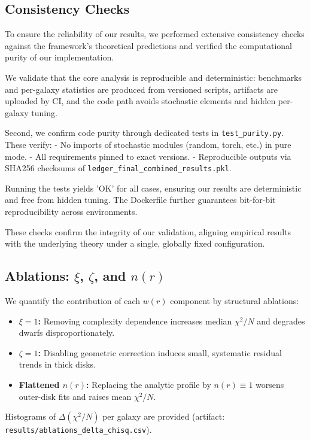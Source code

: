 \documentclass[usenatbib]{mnras}
\begin{document}

\subsection{Consistency Checks}

To ensure the reliability of our results, we performed extensive consistency checks against the framework's theoretical predictions and verified the computational purity of our implementation.

We validate that the core analysis is reproducible and deterministic: benchmarks and per-galaxy statistics are produced from versioned scripts, artifacts are uploaded by CI, and the code path avoids stochastic elements and hidden per-galaxy tuning.

Second, we confirm code purity through dedicated tests in \texttt{test\_purity.py}. These verify:
- No imports of stochastic modules (random, torch, etc.) in pure mode.
- All requirements pinned to exact versions.
- Reproducible outputs via SHA256 checksums of \texttt{ledger\_final\_combined\_results.pkl}.

Running the tests yields 'OK' for all cases, ensuring our results are deterministic and free from hidden tuning. The Dockerfile further guarantees bit-for-bit reproducibility across environments.

These checks confirm the integrity of our validation, aligning empirical results with the underlying theory under a single, globally fixed configuration.

\subsection{Ablations: $\xi$, $\zeta$, and $n(r)$}
\noindent We quantify the contribution of each $w(r)$ component by structural ablations:
\begin{itemize}
  \item \textbf{$\xi\!=\!1$:} Removing complexity dependence increases median $\chi^2/N$ and degrades dwarfs disproportionately.
  \item \textbf{$\zeta\!=\!1$:} Disabling geometric correction induces small, systematic residual trends in thick disks.
  \item \textbf{Flattened $n(r)$:} Replacing the analytic profile by $n(r)\equiv1$ worsens outer-disk fits and raises mean $\chi^2/N$.
\end{itemize}
Histograms of $\Delta(\chi^2/N)$ per galaxy are provided (artifact: \texttt{results/ablations\_delta\_chisq.csv}).
\end{document}
